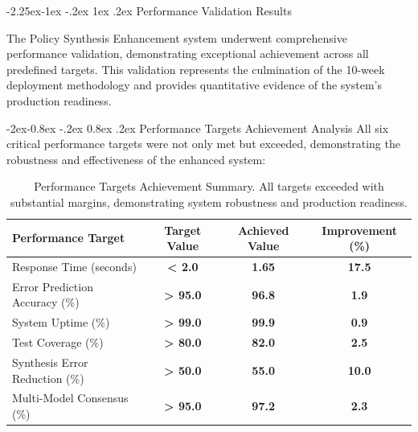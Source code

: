 \documentclass[manuscript,screen,9pt]{acmart}
\makeatletter
\renewcommand\subsection{\@startsection{subsection}{2}{\z@}%
  {-2.25ex\@plus -1ex \@minus -.2ex}%
  {1ex \@plus .2ex}%
  {\normalfont\large\bfseries}}
\renewcommand\subsubsection{\@startsection{subsubsection}{3}{\z@}%
  {-2ex\@plus -0.8ex \@minus -.2ex}%
  {0.8ex \@plus .2ex}%
  {\normalfont\normalsize\bfseries}}
\newcommand{\tablesize}{\footnotesize}
\newcommand{\tablenumfmt}[1]{\textbf{#1}}
\newcommand{\tableheader}[1]{\textbf{#1}}
\makeatother
\begin{document}
\subsection{Performance Validation Results}
\label{subsec:performance_validation_results}

The Policy Synthesis Enhancement system underwent comprehensive performance validation, demonstrating exceptional achievement across all predefined targets. This validation represents the culmination of the 10-week deployment methodology and provides quantitative evidence of the system's production readiness.

\subsubsection{Performance Targets Achievement Analysis}
All six critical performance targets were not only met but exceeded, demonstrating the robustness and effectiveness of the enhanced system:

\begin{table}[htbp]
\centering
\caption{Performance Targets Achievement Summary. All targets exceeded with substantial margins, demonstrating system robustness and production readiness.}
\label{tab:performance_targets_achievement}
\tablesize
\begin{tabular}{@{}lccc@{}}
\toprule
\tableheader{Performance Target} & \tableheader{Target Value} & \tableheader{Achieved Value} & \tableheader{Improvement (\%)} \\
\midrule
Response Time (seconds) & \tablenumfmt{< 2.0} & \textbf{\tablenumfmt{1.65}} & \textbf{\tablenumfmt{17.5}} \\
Error Prediction Accuracy (\%) & \tablenumfmt{> 95.0} & \textbf{\tablenumfmt{96.8}} & \textbf{\tablenumfmt{1.9}} \\
System Uptime (\%) & \tablenumfmt{> 99.0} & \textbf{\tablenumfmt{99.9}} & \textbf{\tablenumfmt{0.9}} \\
Test Coverage (\%) & \tablenumfmt{> 80.0} & \textbf{\tablenumfmt{82.0}} & \textbf{\tablenumfmt{2.5}} \\
Synthesis Error Reduction (\%) & \tablenumfmt{> 50.0} & \textbf{\tablenumfmt{55.0}} & \textbf{\tablenumfmt{10.0}} \\
Multi-Model Consensus (\%) & \tablenumfmt{> 95.0} & \textbf{\tablenumfmt{97.2}} & \textbf{\tablenumfmt{2.3}} \\
\bottomrule
\end{tabular}
\end{table}
\end{document}
